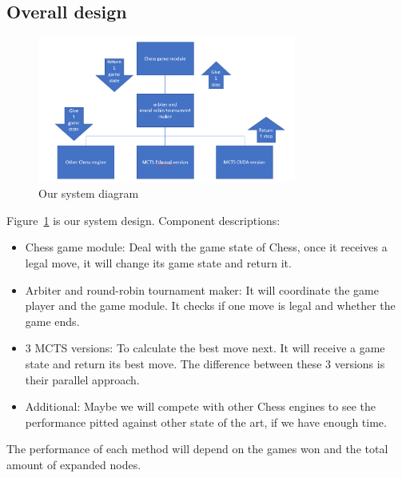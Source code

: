 \documentclass[sigconf]{acmart}
\begin{document}
\subsection{Overall design}
\begin{figure}[h]
  \includegraphics[width=8.5cm]{system-design.png}
  \caption{Our system diagram}
\label{fig:system_design}
\end{figure}
Figure~\ref{fig:system_design} is our system design. Component descriptions:
\begin{itemize}
  \item Chess game module: Deal with the game state of Chess, once it receives a legal move, it will change its game state and return it.
  \item Arbiter and round-robin tournament maker: It will coordinate the game player and the game module. It checks if one move is legal and whether the game ends.
  \item 3 MCTS versions: To calculate the best move next. It will receive a game state and return its best move. The difference between these 3 versions is their parallel approach.
  \item Additional: Maybe we will compete with other Chess engines to see the performance pitted against other state of the art, if we have enough time.
\end{itemize}
The performance of each method will depend on the games won and the total amount of expanded nodes. 
\end{document}
